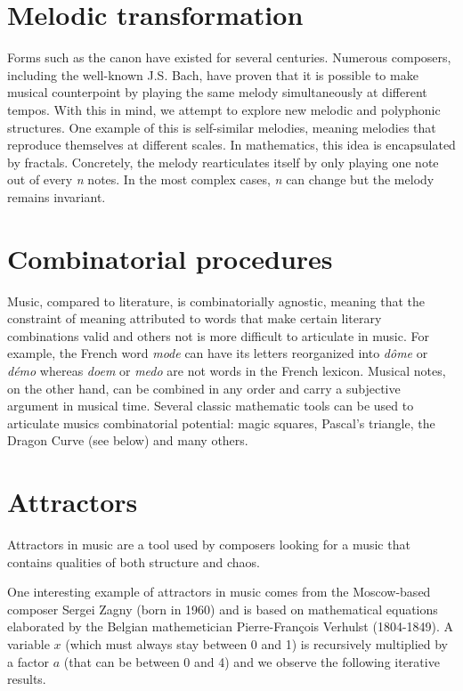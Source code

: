 \documentclass{article}
\begin{document}
\section*{Melodic transformation}
Forms such as the canon have existed for several centuries.  Numerous
composers, including the well-known J.S. Bach, have proven that it is
possible to make musical counterpoint by playing the same melody
simultaneously at different tempos.  With this in mind, we attempt to
explore new melodic and polyphonic structures.  One example of this is
self-similar melodies, meaning melodies that reproduce themselves at
different scales.  In mathematics, this idea is encapsulated by fractals. 
Concretely, the melody rearticulates itself by only playing one note out of
every \emph{n} notes.  In the most complex cases, \emph{n} can change but
the melody remains invariant.
\section*{Combinatorial procedures}
Music, compared to literature, is combinatorially agnostic, meaning that
the constraint of meaning attributed to words that make certain literary
combinations valid and others not is more difficult to articulate in music. 
For example, the French word \emph{mode} can have its letters reorganized
into \emph{d\^{o}me} or \emph{d\'{e}mo} whereas \emph{doem} or \emph{medo}
are not words in the French lexicon.  Musical notes, on the other hand, can
be combined in any order and carry a subjective argument in musical time.
Several classic mathematic tools can be used to articulate musics
combinatorial potential: magic squares, Pascal's triangle, the Dragon
Curve (see below) and many others.
\section*{Attractors}
Attractors in music are a tool used by composers looking for a music that
contains qualities of both structure and chaos.

One interesting example of attractors in music comes from the Moscow-based
composer Sergei Zagny (born in 1960) and is based on mathematical equations
elaborated by the Belgian mathemetician Pierre-Fran\c{c}ois Verhulst
(1804-1849). A variable $x$ (which must always stay between 0 and 1) is
recursively multiplied by a factor $a$ (that can be between 0 and 4) and we
observe the following iterative results.
\end{document}

